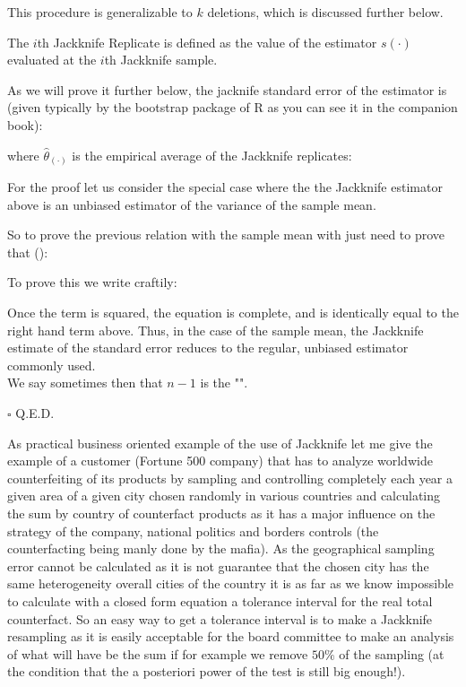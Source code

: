 	This procedure is generalizable to $k$ deletions, which is discussed further below.

	The $i$th Jackknife Replicate is defined as the value of the estimator $s(\cdot)$ evaluated at the $i$th Jackknife sample.
	
	As we will prove it further below, the jacknife standard error of the estimator is (given typically by the bootstrap package of R as you can see it in the companion book):
	
	where $\hat{\theta}_{(\cdot)}$ is the empirical average of the Jackknife replicates:
	
	For the proof let us consider the special case where the the Jackknife estimator above is an unbiased estimator of the variance of the sample mean.
	\begin{dem}
	So to prove the previous relation with the sample mean with just need to prove that ():
	
	To prove this we write craftily:
   
   Once the term is squared, the equation is complete, and is identically equal to the right hand term above. Thus, in the case of the sample mean, the Jackknife estimate of the standard error reduces to the regular, unbiased estimator commonly used.\\
   
   	We say sometimes then that $n-1$ is the "".
	\begin{flushright}
		$\square$  Q.E.D.
	\end{flushright}
	\end{dem}
	As practical business oriented example of the use of Jackknife let me give the example of a customer (Fortune 500 company) that has to analyze worldwide counterfeiting of its products by sampling and controlling completely each year a given area of a given city chosen randomly in various countries and calculating the sum by country of counterfact products as it has a major influence on the strategy of the company, national politics and borders controls (the counterfacting being manly done by the mafia). As the geographical sampling error cannot be calculated as it is not guarantee that the chosen city has the same heterogeneity overall cities of the country it is as far as we know impossible to calculate with a closed form equation a tolerance interval for the real total counterfact. So an easy way to get a tolerance interval is to make a Jackknife resampling as it is easily acceptable for the board committee to make an analysis of what will have be the sum if for example we remove $50\%$ of the sampling (at the condition that the a posteriori power of the test is still big enough!).
	
